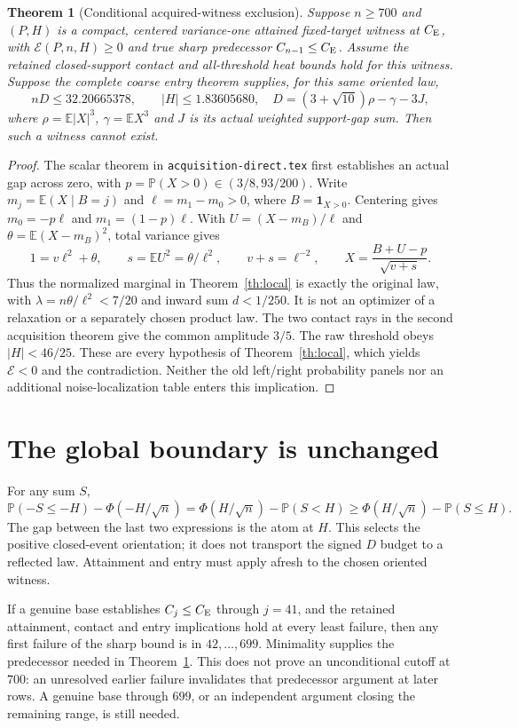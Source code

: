 \documentclass[11pt]{article}
\newcommand{\E}{\mathbb E}\newcommand{\Pp}{\mathbb P}
\newcommand{\CE}{C_{\rm E}}
\newtheorem{theorem}{Theorem}\newtheorem{corollary}[theorem]{Corollary}
\begin{document}
\begin{theorem}[Conditional acquired-witness exclusion]\label{th:acquired}
Suppose $n\ge700$ and $(P,H)$ is a compact, centered variance-one attained
fixed-target witness at $\CE$, with $\mathcal E(P,n,H)\ge0$ and true sharp
predecessor $C_{n-1}\le\CE$. Assume the retained closed-support contact and
all-threshold heat bounds hold for this witness. Suppose the complete coarse
entry theorem supplies, for this same oriented law,
\[
 nD\le32.20665378,\qquad |H|\le1.83605680,
 \quad D=(3+\sqrt{10})\rho-\gamma-3J,
\]
where $\rho=\E|X|^3$, $\gamma=\E X^3$ and $J$ is its actual weighted
support-gap sum. Then such a witness cannot exist.
\end{theorem}
\begin{proof}
The scalar theorem in \texttt{acquisition-direct.tex} first establishes an
actual gap across zero, with $p=\Pp(X>0)\in(3/8,93/200)$.
Write $m_j=\E(X\mid B=j)$ and $\ell=m_1-m_0>0$, where
$B=\mathbf1_{X>0}$. Centering gives $m_0=-p\ell$ and $m_1=(1-p)\ell$.
With $U=(X-m_B)/\ell$ and $\theta=\E(X-m_B)^2$, total variance gives
\[
 1=v\ell^2+\theta,\qquad s=\E U^2=\theta/\ell^2,
 \qquad v+s=\ell^{-2},\qquad X=\frac{B+U-p}{\sqrt{v+s}}.
\]
Thus the normalized marginal in Theorem~\ref{th:local} is exactly the
original law, with $\lambda=n\theta/\ell^2<7/20$ and inward sum $d<1/250$.
It is not an optimizer of a relaxation or a separately chosen product law.
The two contact rays in the second acquisition theorem give the common
amplitude $3/5$. The raw threshold obeys $|H|<46/25$. These are every
hypothesis of Theorem~\ref{th:local}, which yields $\mathcal E<0$ and the
contradiction. Neither the old left/right probability panels nor an additional
noise-localization table enters this implication.
\end{proof}

\section*{The global boundary is unchanged}
For any sum $S$,
\[
 \Pp(-S\le-H)-\Phi(-H/\sqrt n)
 =\Phi(H/\sqrt n)-\Pp(S<H)
 \ge\Phi(H/\sqrt n)-\Pp(S\le H).
\]
The gap between the last two expressions is the atom at $H$. This selects
the positive closed-event orientation; it does not transport the signed
$D$ budget to a reflected law. Attainment and entry must apply afresh to
the chosen oriented witness.

If a genuine base establishes $C_j\le\CE$ through $j=41$, and the retained
attainment, contact and entry implications hold at every least failure, then any
first failure of the sharp bound is in $42,\ldots,699$. Minimality supplies
the predecessor needed in Theorem~\ref{th:acquired}. This does not prove an
unconditional cutoff at $700$: an unresolved earlier failure invalidates
that predecessor argument at later rows. A genuine base through $699$, or
an independent argument closing the remaining range, is still needed.
\end{document}
